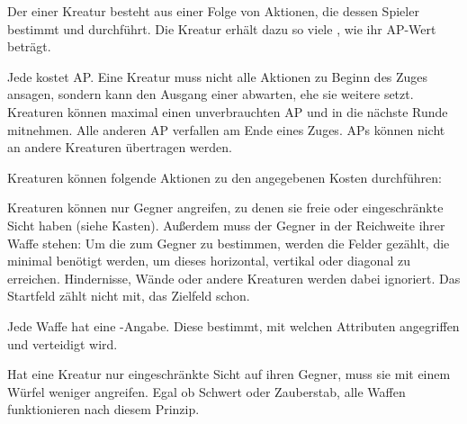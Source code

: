 {		Der  einer Kreatur besteht aus einer Folge von Aktionen, die dessen Spieler bestimmt und durchführt. Die Kreatur erhält dazu so viele , wie ihr AP-Wert beträgt.

		Jede  kostet AP. Eine Kreatur muss nicht alle Aktionen zu Beginn des Zuges ansagen, sondern kann den Ausgang einer abwarten, ehe sie weitere setzt. Kreaturen können maximal einen unverbrauchten AP  und in die nächste Runde mitnehmen. Alle anderen AP verfallen am Ende eines Zuges. APs können nicht an andere Kreaturen übertragen werden.

		Kreaturen können folgende Aktionen zu den angegebenen Kosten durchführen:

		\medskip
		\medskip

			Kreaturen können nur Gegner angreifen, zu denen sie freie oder eingeschränkte Sicht haben (siehe Kasten). Außerdem muss der Gegner in der Reichweite ihrer Waffe stehen: Um die  zum Gegner zu bestimmen, werden die Felder gezählt, die minimal benötigt werden, um dieses horizontal, vertikal oder diagonal zu erreichen. Hindernisse, Wände oder andere Kreaturen werden dabei ignoriert. Das Startfeld zählt nicht mit, das Zielfeld schon.

			Jede Waffe hat eine -Angabe. Diese bestimmt, mit welchen Attributen angegriffen und verteidigt wird.


			\noindent
			Hat eine Kreatur nur eingeschränkte Sicht auf ihren Gegner, muss sie mit einem Würfel weniger angreifen. Egal ob Schwert oder Zauberstab, alle Waffen funktionieren nach diesem Prinzip.

}
